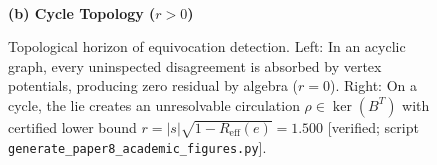 \begin{figure}[htbp]
\begin{minipage}{0.48\textwidth}
\\[4pt]
{\small\bfseries (b) Cycle Topology ($r > 0$)}
\end{minipage}
\caption{Topological horizon of equivocation detection. Left: In an acyclic graph, every uninspected disagreement is absorbed by vertex potentials, producing zero residual by algebra ($r = 0$). Right: On a cycle, the lie creates an unresolvable circulation $\rho \in \ker(B^T)$ with certified lower bound $r = |s|\sqrt{1 - R_{\mathrm{eff}}(e)} = 1.500$ [verified; script \texttt{generate\_paper8\_academic\_figures.py}].}
\label{fig:topological-loop}
\end{figure}
